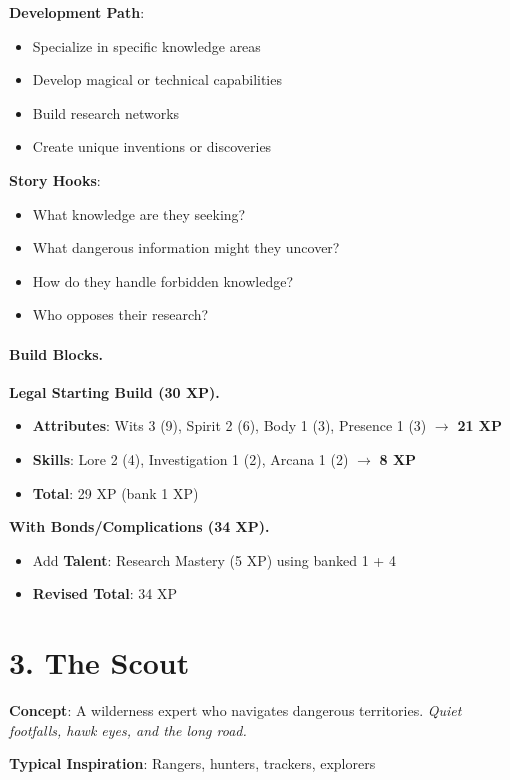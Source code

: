 \begin{multicols}{2}
\textbf{Development Path}:
\begin{itemize}
\item Specialize in specific knowledge areas
\item Develop magical or technical capabilities
\item Build research networks
\item Create unique inventions or discoveries
\end{itemize}

\textbf{Story Hooks}:
\begin{itemize}
\item What knowledge are they seeking?
\item What dangerous information might they uncover?
\item How do they handle forbidden knowledge?
\item Who opposes their research?
\end{itemize}

\paragraph{Build Blocks.}
\textbf{Legal Starting Build (30 XP).}
\begin{itemize}
\item \textbf{Attributes}: Wits 3 (9), Spirit 2 (6), Body 1 (3), Presence 1 (3) $\rightarrow$ \textbf{21 XP}
\item \textbf{Skills}: Lore 2 (4), Investigation 1 (2), Arcana 1 (2) $\rightarrow$ \textbf{8 XP}
\item \textbf{Total}: 29 XP (bank 1 XP)
\end{itemize}
\textbf{With Bonds/Complications (34 XP).}
\begin{itemize}
\item Add \textbf{Talent}: Research Mastery (5 XP) using banked 1 + 4
\item \textbf{Revised Total}: 34 XP
\end{itemize}

\section{3. The Scout}

\textbf{Concept}: A wilderness expert who navigates dangerous territories. \emph{Quiet footfalls, hawk eyes, and the long road.}

\textbf{Typical Inspiration}: Rangers, hunters, trackers, explorers


\end{multicols}
